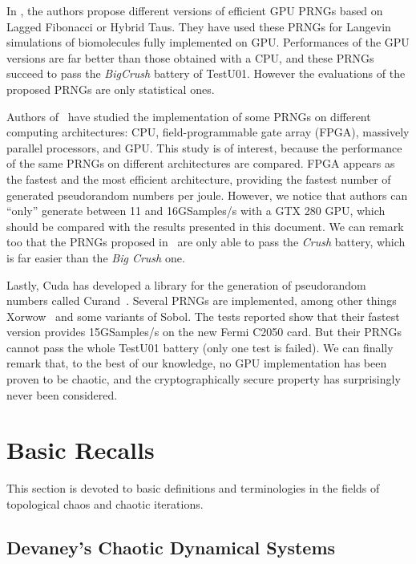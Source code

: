 \documentclass{article}
\begin{document}
In \cite{ZRKB10}, the authors propose  different versions of efficient GPU PRNGs
based on  Lagged Fibonacci or Hybrid  Taus.  They have  used these
PRNGs   for  Langevin   simulations   of  biomolecules   fully  implemented   on
GPU. Performances of  the GPU versions are far better than  those obtained with a
CPU, and these PRNGs succeed to pass the {\it BigCrush} battery of TestU01. 
However the evaluations of the proposed PRNGs are only statistical ones.


Authors of~\cite{conf/fpga/ThomasHL09}  have studied the  implementation of some
PRNGs on  different computing architectures: CPU,  field-programmable gate array
(FPGA), massively parallel  processors, and GPU. This study is of interest, because
the  performance  of the  same  PRNGs on  different architectures are compared. 
FPGA appears as  the  fastest  and the most
efficient architecture, providing the fastest number of generated pseudorandom numbers
per joule. 
However, we notice that authors can ``only'' generate between 11 and 16GSamples/s
with a GTX 280  GPU, which should be compared with
the results presented in this document.
We can remark too that the PRNGs proposed in~\cite{conf/fpga/ThomasHL09} are only
able to pass the {\it Crush} battery, which is far easier than the {\it Big Crush} one.

Lastly, Cuda  has developed  a  library for  the  generation of  pseudorandom numbers  called
Curand~\cite{curand11}.        Several       PRNGs        are       implemented, among
other things 
Xorwow~\cite{Marsaglia2003} and  some variants of Sobol. The  tests reported show that
their  fastest version provides  15GSamples/s on  the new  Fermi C2050  card. 
But their PRNGs cannot pass the whole TestU01 battery (only one test is failed).
\newline
\newline
We can finally remark that, to the best of our knowledge, no GPU implementation has been proven to be chaotic, and the cryptographically secure property has surprisingly never been considered.

\section{Basic Recalls}
\label{section:BASIC RECALLS}

This section is devoted to basic definitions and terminologies in the fields of
topological chaos and chaotic iterations.
\subsection{Devaney's Chaotic Dynamical Systems}
\end{document}
